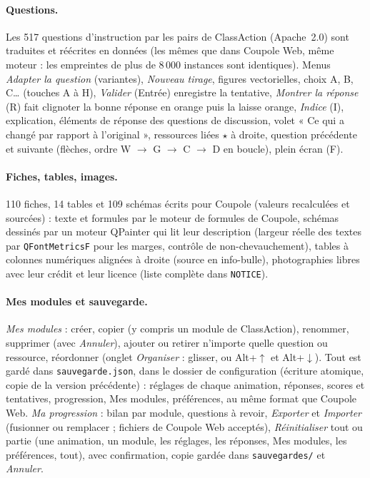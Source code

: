 \paragraph{Questions.} Les 517 questions d'instruction par les pairs de ClassAction (Apache~2.0) sont traduites et
réécrites en données (les mêmes que dans Coupole Web, même moteur : les empreintes de plus de 8\,000 instances sont
identiques). Menus \emph{Adapter la question} (variantes), \emph{Nouveau tirage}, figures vectorielles, choix A, B, C\dots{}
(touches A à H), \emph{Valider} (Entrée) enregistre la tentative, \emph{Montrer la réponse} (R) fait clignoter la bonne
réponse en orange puis la laisse orange, \emph{Indice} (I), explication, éléments de réponse des questions de
discussion, volet « Ce qui a changé par rapport à l'original », ressources liées $\star$ à droite, question précédente et
suivante (flèches, ordre W $\to$ G $\to$ C $\to$ D en boucle), plein écran (F).

\paragraph{Fiches, tables, images.} 110 fiches, 14 tables et 109 schémas écrits pour Coupole (valeurs recalculées et
sourcées) : texte et formules par le moteur de formules de Coupole, schémas dessinés par un moteur QPainter qui lit leur
description (largeur réelle des textes par \texttt{QFontMetricsF} pour les marges, contrôle de non-chevauchement),
tables à colonnes numériques alignées à droite (source en info-bulle), photographies libres avec leur crédit et leur
licence (liste complète dans \texttt{NOTICE}).

\paragraph{Mes modules et sauvegarde.} \emph{Mes modules} : créer, copier (y compris un module de ClassAction),
renommer, supprimer (avec \emph{Annuler}), ajouter ou retirer n'importe quelle question ou ressource, réordonner
(onglet \emph{Organiser} : glisser, ou Alt+$\uparrow$ et Alt+$\downarrow$). Tout est gardé dans \texttt{sauvegarde.json}, dans le dossier
de configuration (écriture atomique, copie de la version précédente) : réglages de chaque animation, réponses, scores
et tentatives, progression, Mes modules, préférences, au même format que Coupole Web. \emph{Ma progression} : bilan par
module, questions à revoir, \emph{Exporter} et \emph{Importer} (fusionner ou remplacer ; fichiers de Coupole Web
acceptés), \emph{Réinitialiser} tout ou partie (une animation, un module, les réglages, les réponses, Mes modules, les
préférences, tout), avec confirmation, copie gardée dans \texttt{sauvegardes/} et \emph{Annuler}.

